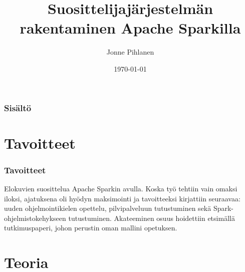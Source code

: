 \documentclass{beamer}
\title[Short title]{Suosittelijajärjestelmän rakentaminen Apache Sparkilla} %
\author{Jonne Pihlanen} %
\institute[TUT] %
{
Tampereen Teknillinen Yliopisto \\ %
\medskip
\textit{jonne.pihlanen@student.tut.fi} %
}
\date{\today} %
\begin{document}
\begin{frame}
\titlepage %
\end{frame}

\begin{frame}
\frametitle{Sisältö} %
\tableofcontents %
\end{frame}


\section{Tavoitteet}

\begin{frame}
\frametitle{Tavoitteet}

Elokuvien suosittelua Apache Sparkin avulla.
Koska työ tehtiin vain omaksi iloksi, ajatuksena oli hyödyn maksimointi ja tavoitteeksi kirjattiin seuraavaa: uuden ohjelmointikielen opettelu, pilvipalveluun tutustuminen sekä Spark-ohjelmistokehykseen tutustuminen.
Akateeminen osuus hoidettiin etsimällä tutkimuspaperi, johon perustin oman mallini opetuksen.

\end{frame}


\section{Teoria}
\end{document}
